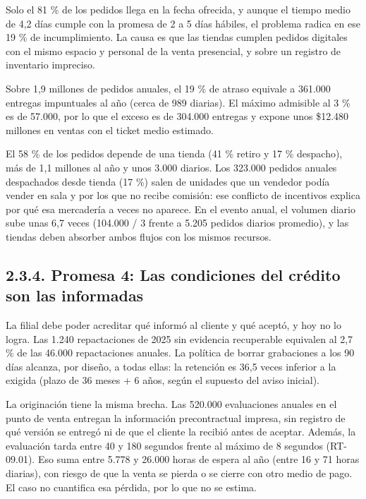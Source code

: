 \documentclass[11pt]{article}
\begin{document}
Solo el 81 \% de los pedidos llega en la fecha ofrecida, y aunque el tiempo medio de 4,2 días cumple con la promesa de 2 a 5 días hábiles, el problema radica en ese 19 \% de incumplimiento. La causa es que las tiendas cumplen pedidos digitales con el mismo espacio y personal de la venta presencial, y sobre un registro de inventario impreciso.

Sobre 1,9 millones de pedidos anuales, el 19 \% de atraso equivale a 361.000 entregas impuntuales al año (cerca de 989 diarias). El máximo admisible al 3 \% es de 57.000, por lo que el exceso es de 304.000 entregas y expone unos \$12.480 millones en ventas con el ticket medio estimado.

El 58 \% de los pedidos depende de una tienda (41 \% retiro y 17 \% despacho), más de 1,1 millones al año y unos 3.000 diarios. Los 323.000 pedidos anuales despachados desde tienda (17 \%) salen de unidades que un vendedor podía vender en sala y por los que no recibe comisión: ese conflicto de incentivos explica por qué esa mercadería a veces no aparece. En el evento anual, el volumen diario sube unas 6,7 veces (104.000 / 3 frente a 5.205 pedidos diarios promedio), y las tiendas deben absorber ambos flujos con los mismos recursos.

\subsection{2.3.4. Promesa 4: Las condiciones del crédito son las informadas}\label{promesa-4-las-condiciones-del-credito-son-las-informadas}

La filial debe poder acreditar qué informó al cliente y qué aceptó, y hoy no lo logra. Las 1.240 repactaciones de 2025 sin evidencia recuperable equivalen al 2,7 \% de las 46.000 repactaciones anuales. La política de borrar grabaciones a los 90 días alcanza, por diseño, a todas ellas: la retención es 36,5 veces inferior a la exigida (plazo de 36 meses + 6 años, según el supuesto del aviso inicial).

La originación tiene la misma brecha. Las 520.000 evaluaciones anuales en el punto de venta entregan la información precontractual impresa, sin registro de qué versión se entregó ni de que el cliente la recibió antes de aceptar. Además, la evaluación tarda entre 40 y 180 segundos frente al máximo de 8 segundos (RT-09.01). Eso suma entre 5.778 y 26.000 horas de espera al año (entre 16 y 71 horas diarias), con riesgo de que la venta se pierda o se cierre con otro medio de pago. El caso no cuantifica esa pérdida, por lo que no se estima.
\end{document}
